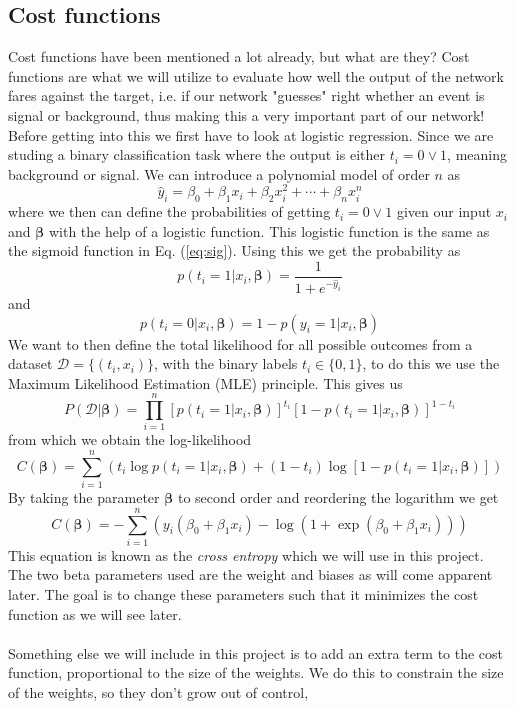\documentclass[14pt, a4paper]{book}
\begin{document}
\subsection{Cost functions}
Cost functions have been mentioned a lot already, but what are they? Cost functions are what we will utilize to evaluate how well the output of the network fares against the target, i.e. if our network "guesses" right whether an event is signal or background, 
thus making this a very important part of our network! Before getting into this we first have to look at logistic regression. Since we are studing a binary classification task where the output is either $t_i=0\vee 1$, meaning background or signal. 
We can introduce a polynomial model of order $n$ as
$$
\hat{y}_i=\beta_0+\beta_1x_i+\beta_2x_i^2+\cdots+\beta_nx_i^n
$$
where we then can define the probabilities of getting $t_i=0\vee1$ given our input $x_i$ and $\bm{\beta}$ with the help of a logistic function. This logistic function is the same as the sigmoid function in Eq. (\ref{eq:sig}). 
Using this we get the probability as
$$
p(t_i=1\vert x_i,\bm{\beta})=\frac{1}{1+e^{-\hat{y}_i}}
$$
and
$$
p(t_i=0\vert x_i,\bm{\beta})=1- p(y_i=1\vert x_i,\bm{\beta})
$$
We want to then define the total likelihood for all possible outcomes from a dataset $\mathcal{D}=\{(t_i,x_i)\}$, with the binary labels $t_i\in\{0,1\}$, to do this we use the Maximum Likelihood Estimation (MLE) principle. 
This gives us
$$
P(\mathcal{D}\vert\bm{\beta})=\prod_{i=1}^n\left[p(t_i=1\vert x_i,\bm{\beta})\right]^{t_i}\left[1-p(t_i=1\vert x_i,\bm{\beta})\right]^{1-t_i}
$$
from which we obtain the log-likelihood
$$
C(\bm{\beta})=\sum_{i=1}^n\left(t_i\log p(t_i=1\vert x_i,\bm{\beta})+(1-t_i)\log[1-p(t_i=1\vert x_i,\bm{\beta})]\right)
$$
By taking the parameter $\bm{\beta}$ to second order and reordering the logarithm we get
\begin{equation}\label{eq:CrossEntropy}
    C(\bm{\beta})=-\sum_{i=1}^n(y_i(\beta_0+\beta_1x_i)-\log(1+\exp(\beta_0+\beta_1x_i)))
\end{equation}
This equation is known as the \textit{cross entropy} which we will use in this project. The two beta parameters used are the weight and biases as will come apparent later. The goal is to change these parameters such that it minimizes the cost function as we will see later. \\
\\Something else we will include in this project is to add an extra term to the cost function, proportional to the size of the weights. We do this to constrain the size of the weights, so they don't grow out of control, 
\end{document}
